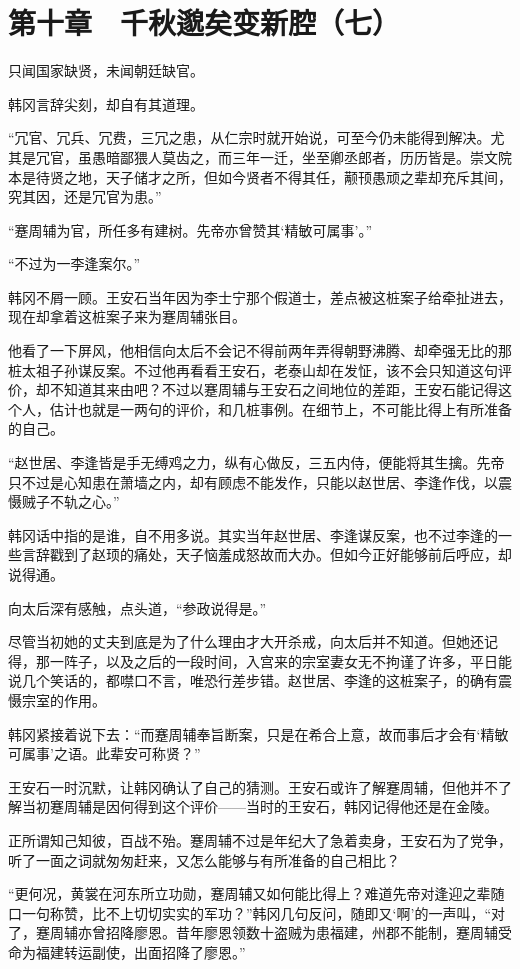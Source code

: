 \section{第十章　千秋邈矣变新腔（七）}

只闻国家缺贤，未闻朝廷缺官。

韩冈言辞尖刻，却自有其道理。

“冗官、冗兵、冗费，三冗之患，从仁宗时就开始说，可至今仍未能得到解决。尤其是冗官，虽愚暗鄙猥人莫齿之，而三年一迁，坐至卿丞郎者，历历皆是。崇文院本是待贤之地，天子储才之所，但如今贤者不得其任，颟顸愚顽之辈却充斥其间，究其因，还是冗官为患。”

“蹇周辅为官，所任多有建树。先帝亦曾赞其‘精敏可属事’。”

“不过为一李逢案尔。”

韩冈不屑一顾。王安石当年因为李士宁那个假道士，差点被这桩案子给牵扯进去，现在却拿着这桩案子来为蹇周辅张目。

他看了一下屏风，他相信向太后不会记不得前两年弄得朝野沸腾、却牵强无比的那桩太祖子孙谋反案。不过他再看看王安石，老泰山却在发怔，该不会只知道这句评价，却不知道其来由吧？不过以蹇周辅与王安石之间地位的差距，王安石能记得这个人，估计也就是一两句的评价，和几桩事例。在细节上，不可能比得上有所准备的自己。

“赵世居、李逢皆是手无缚鸡之力，纵有心做反，三五内侍，便能将其生擒。先帝只不过是心知患在萧墙之内，却有顾虑不能发作，只能以赵世居、李逢作伐，以震慑贼子不轨之心。”

韩冈话中指的是谁，自不用多说。其实当年赵世居、李逢谋反案，也不过李逢的一些言辞戳到了赵顼的痛处，天子恼羞成怒故而大办。但如今正好能够前后呼应，却说得通。

向太后深有感触，点头道，“参政说得是。”

尽管当初她的丈夫到底是为了什么理由才大开杀戒，向太后并不知道。但她还记得，那一阵子，以及之后的一段时间，入宫来的宗室妻女无不拘谨了许多，平日能说几个笑话的，都噤口不言，唯恐行差步错。赵世居、李逢的这桩案子，的确有震慑宗室的作用。

韩冈紧接着说下去：“而蹇周辅奉旨断案，只是在希合上意，故而事后才会有‘精敏可属事’之语。此辈安可称贤？”

王安石一时沉默，让韩冈确认了自己的猜测。王安石或许了解蹇周辅，但他并不了解当初蹇周辅是因何得到这个评价——当时的王安石，韩冈记得他还是在金陵。

正所谓知己知彼，百战不殆。蹇周辅不过是年纪大了急着卖身，王安石为了党争，听了一面之词就匆匆赶来，又怎么能够与有所准备的自己相比？

“更何况，黄裳在河东所立功勋，蹇周辅又如何能比得上？难道先帝对逢迎之辈随口一句称赞，比不上切切实实的军功？”韩冈几句反问，随即又‘啊’的一声叫，“对了，蹇周辅亦曾招降廖恩。昔年廖恩领数十盗贼为患福建，州郡不能制，蹇周辅受命为福建转运副使，出面招降了廖恩。”

